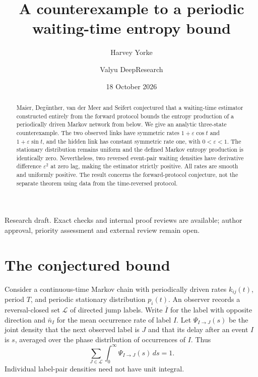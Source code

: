 \documentclass[11pt]{amsart}
\title[A periodic waiting-time counterexample]{A counterexample to a periodic waiting-time entropy bound}
\author{Harvey Yorke}\address{Valyu AI}
\author{Valyu DeepResearch}\address{Valyu AI}
\date{18 October 2026}
\newcommand{\rev}[1]{\overline{#1}}
\begin{document}
\raggedbottom
\begin{abstract}
Maier, Deg\"unther, van der Meer and Seifert conjectured that a waiting-time
estimator constructed entirely from the forward protocol bounds the entropy
production of a periodically driven Markov network from below.
We give an analytic three-state counterexample. The two observed links have
symmetric rates $1+\varepsilon\cos t$ and $1+\varepsilon\sin t$, and the
hidden link has constant symmetric rate one, with $0<\varepsilon<1$.
The stationary distribution remains uniform and the defined Markov entropy
production is identically zero. Nevertheless, two reversed event-pair
waiting densities have derivative difference $\varepsilon^2$ at zero lag,
making the estimator strictly positive. All rates are smooth and uniformly
positive. The result concerns the forward-protocol conjecture, not the
separate theorem using data from the time-reversed protocol.
\end{abstract}
\maketitle
\begin{center}\small
Research draft. Exact checks and internal proof reviews are available;
author approval, priority assessment and external review remain open.
\end{center}

\section{The conjectured bound}
Consider a continuous-time Markov chain with periodically driven rates
$k_{ij}(t)$, period $T$, and periodic stationary distribution $p_i(t)$.
An observer records a reversal-closed set $\mathcal L$ of directed jump
labels. Write $\rev I$ for the label with opposite direction and
$\bar n_I$ for the mean occurrence rate of label $I$.
Let $\Psi_{I\to J}(s)$ be the joint density that the next observed label is
$J$ and that its delay after an event $I$ is $s$, averaged over the phase
distribution of occurrences of $I$. Thus
\begin{equation}\label{eq:rownorm}
 \sum_{J\in\mathcal L}\int_0^\infty\Psi_{I\to J}(s)\,ds=1.
\end{equation}
Individual label-pair densities need not have unit integral.
\end{document}

